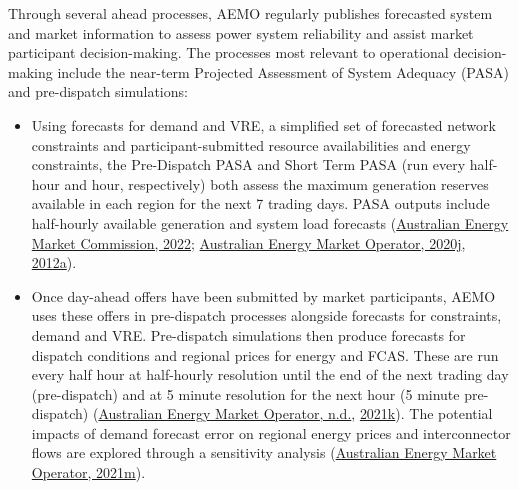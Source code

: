 \documentclass[12pt,a4paper,]{report}
\providecommand{\tightlist}{%
  \setlength{\itemsep}{0pt}\setlength{\parskip}{0pt}}
\begin{document}
Through several ahead processes, AEMO regularly publishes forecasted
system and market information to assess power system reliability and
assist market participant decision-making. The processes most relevant
to operational decision-making include the near-term Projected
Assessment of System Adequacy (PASA) and pre-dispatch simulations:

\begin{itemize}
\tightlist
\item
  Using forecasts for demand and VRE, a simplified set of forecasted
  network constraints and participant-submitted resource availabilities
  and energy constraints, the Pre-Dispatch PASA and Short Term PASA (run
  every half-hour and hour, respectively) both assess the maximum
  generation reserves available in each region for the next 7 trading
  days. PASA outputs include half-hourly available generation and system
  load forecasts
  (\protect\hyperlink{ref-australianenergymarketcommissionUpdatingShortTerm2022}{Australian
  Energy Market Commission, 2022};
  \protect\hyperlink{ref-australianenergymarketoperatorReliabilityStandardImplementation2020}{Australian
  Energy Market Operator, 2020j},
  \protect\hyperlink{ref-australianenergymarketoperatorShortTermPASA2012}{2012a}).
\item
  Once day-ahead offers have been submitted by market participants, AEMO
  uses these offers in pre-dispatch processes alongside forecasts for
  constraints, demand and VRE. Pre-dispatch simulations then produce
  forecasts for dispatch conditions and regional prices for energy and
  FCAS. These are run every half hour at half-hourly resolution until
  the end of the next trading day (pre-dispatch) and at 5 minute
  resolution for the next hour (5 minute pre-dispatch)
  (\protect\hyperlink{ref-australianenergymarketoperatorPreDispatch}{Australian
  Energy Market Operator, n.d.},
  \protect\hyperlink{ref-australianenergymarketoperatorPredispatchOperatingProcedure2021}{2021k}).
  The potential impacts of demand forecast error on regional energy
  prices and interconnector flows are explored through a sensitivity
  analysis
  (\protect\hyperlink{ref-australianenergymarketoperatorPreDispatchSensitivities2021}{Australian
  Energy Market Operator, 2021m}).
\end{itemize}
\end{document}
